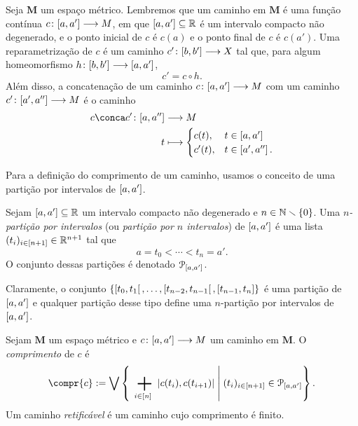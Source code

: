 Seja $\bm M$ um espaço métrico. Lembremos que um caminho em $\bm M$ é uma função contínua ${c}\colon {\left[{a},{a'}\right]} \longrightarrow {M}$, em que $\left[{a},{a'}\right] \subseteq \mathbb{R}$ é um intervalo compacto não degenerado, e o ponto inicial de $c$ é $c(a)$ e o ponto final de $c$ é $c(a')$. Uma reparametrização de $c$ é um caminho ${c'}\colon {\left[{b},{b'}\right]} \longrightarrow {X}$ tal que, para algum homeomorfismo ${h}\colon {\left[{b},{b'}\right]} \longrightarrow {\left[{a},{a'}\right]}$,
	\begin{equation*}
	c' = c \circ h.
	\end{equation*}
Além disso, a concatenação de um caminho ${c}\colon {\left[{a},{a'}\right]} \longrightarrow {M}$ com um caminho ${c'}\colon {\left[{a'},{a''}\right]} \longrightarrow {M}$ é o caminho
	\begin{align*}
	\func{c \conca c'}{\intff{a}{a''}}{M}{t}{
		\begin{cases}
		c(t),	& t \in \intff{a}{a'} \\
		c'(t),	& t \in \intff{a'}{a''}.
		\end{cases}
	}
	\end{align*}

Para a definição do comprimento de um caminho, usamos o conceito de uma partição por intervalos de $\left[{a},{a'}\right]$.

\begin{definition}
Sejam $\left[{a},{a'}\right] \subseteq \mathbb{R}$ um intervalo compacto não degenerado e $n \in \mathbb{N} \smallsetminus \{0\}$. Uma \emph{$n$-partição por intervalos} (ou \emph{partição por $n$ intervalos}) de $\left[{a},{a'}\right]$ é uma lista $(t_i)_{i \in [n+1]} \in \mathbb{R}^{n+1}$ tal que
	\begin{equation*}
	a = t_0 < \cdots < t_n = a'.
	\end{equation*}
O conjunto dessas partições é denotado $\mathcal{P}_{\left[{a},{a'}\right]}$.
\end{definition}

Claramente, o conjunto $\{\left[{t_0},{t_1}\right[,\ldots,\left[{t_{n-2}},{t_{n-1}}\right[,\left[{t_{n-1}},{t_{n}}\right]\}$ é uma partição de $\left[{a},{a'}\right]$ e qualquer partição desse tipo define uma $n$-partição por intervalos de $\left[{a},{a'}\right]$.

\begin{definition}
Sejam $\bm M$ um espaço métrico e ${c}\colon {\left[{a},{a'}\right]} \longrightarrow {M}$ um caminho em $\bm M$. O \emph{comprimento} de $c$ é
	\begin{equation*}
	\compr{c} := \sup\set{\sum_{i \in [n]} \dist{c(t_i)}{c(t_{i+1})}}{(t_i)_{i \in [n+1]} \in \Part_{\intff{a}{a'}}}.
	\end{equation*}
Um caminho \emph{retificável} é um caminho cujo comprimento é finito.
\end{definition}

